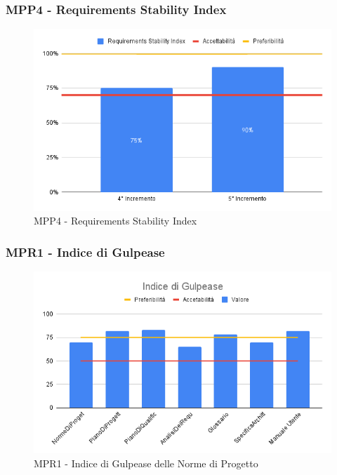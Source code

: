 \subsubsection{MPP4 - Requirements Stability Index}

\begin{figure}[H]
	\centering
	\includegraphics[scale = 0.6]{sezioni/Images/PB/RequirementsStabilityIndex.png}
	\caption{MPP4 - Requirements Stability Index}
\end{figure}

\subsubsection{MPR1 - Indice di Gulpease}

\begin{figure}[H]
	\centering
	\includegraphics[scale = 0.6]{sezioni/Images/PB/GulpeaseGenerale.png}
	\caption{MPR1 - Indice di Gulpease delle Norme di Progetto}
\end{figure}

